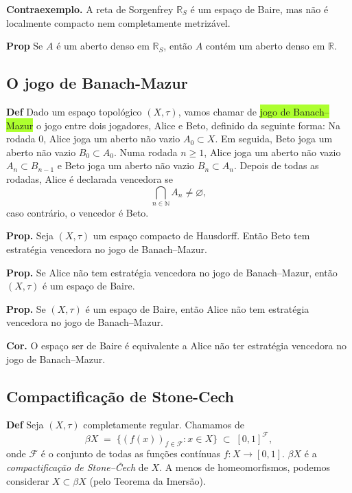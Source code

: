 \documentclass{article}
\begin{document}
\begin{landscape}
\begin{multicols}{3}
\textbf{Contraexemplo.} A reta de Sorgenfrey \(\mathbb{R}_S\) é um espaço de Baire, mas não é localmente compacto nem completamente metrizável.

\medskip

\textbf{Prop} Se \(A\) é um aberto denso em \(\mathbb{R}_S\), então \(A\) contém um aberto denso em \(\mathbb{R}\).
\subsection{O jogo de Banach-Mazur}
\medskip
\textbf{Def} Dado um espaço topológico \((X,\tau)\), vamos chamar de \colorbox{GreenYellow}{jogo de Banach–Mazur} o jogo entre dois jogadores, Alice e Beto, definido da seguinte forma:  
Na rodada \(0\), Alice joga um aberto não vazio \(A_0\subset X\). Em seguida, Beto joga um aberto não vazio \(B_0\subset A_0\). Numa rodada \(n\ge1\), Alice joga um aberto não vazio \(A_n\subset B_{n-1}\) e Beto joga um aberto não vazio \(B_n\subset A_n\). Depois de todas as rodadas, Alice é declarada vencedora se  
\[
\bigcap_{n\in\mathbb{N}}A_n\neq\varnothing,
\]
caso contrário, o vencedor é Beto.

\medskip
\textbf{Prop.} Seja \((X,\tau)\) um espaço compacto de Hausdorff. Então Beto tem estratégia vencedora no jogo de Banach–Mazur.

\medskip
\textbf{Prop.} Se Alice não tem estratégia vencedora no jogo de Banach–Mazur, então \((X,\tau)\) é um espaço de Baire.

\medskip
\textbf{Prop.} Se \((X,\tau)\) é um espaço de Baire, então Alice não tem estratégia vencedora no jogo de Banach–Mazur.

\medskip
\textbf{Cor.} O espaço ser de Baire é equivalente a Alice não ter estratégia vencedora no jogo de Banach–Mazur.

\medskip
\end{multicols}
\begin{center}
\section{Compactificação de Stone-Cech}
    
\end{center}
\begin{multicols}{3}
\textbf{Def} Seja \((X,\tau)\) completamente regular. Chamamos de
\[
\beta X \;=\;\bigl\{(f(x))_{f\in\mathcal{F}} : x\in X\bigr\}
\;\subset\;[0,1]^{\mathcal{F}},
\]
onde \(\mathcal{F}\) é o conjunto de todas as funções contínuas \(f\colon X\to[0,1]\).  
\(\beta X\) é a \emph{compactificação de Stone–Čech} de \(X\).  
A menos de homeomorfismos, podemos considerar \(X\subset\beta X\) (pelo Teorema da Imersão).  


\end{multicols}
\end{landscape}
\end{document}
